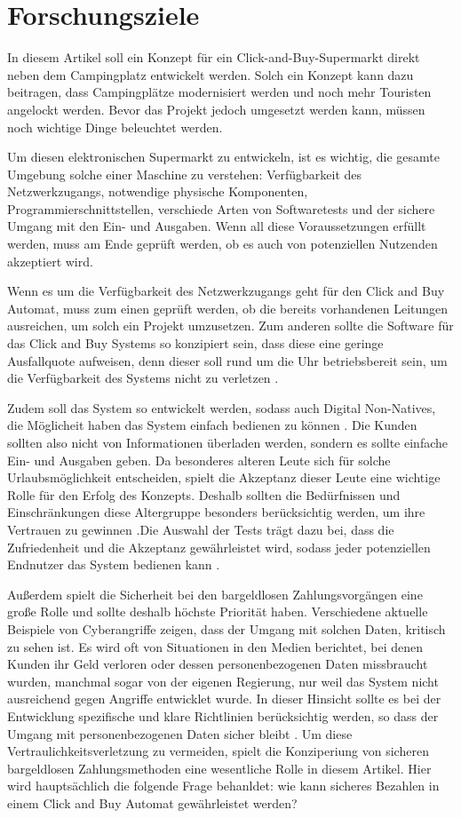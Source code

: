 \section{Forschungsziele}


In diesem Artikel soll ein Konzept für ein Click-and-Buy-Supermarkt direkt neben dem Campingplatz 
entwickelt werden. Solch ein Konzept kann dazu beitragen, dass Campingplätze modernisiert werden 
und noch mehr Touristen angelockt werden. Bevor das Projekt jedoch umgesetzt werden kann, müssen 
noch wichtige Dinge beleuchtet werden. 

Um diesen elektronischen Supermarkt zu entwickeln, ist es wichtig, die gesamte Umgebung solche einer Maschine
zu verstehen: Verfügbarkeit des Netzwerkzugangs, notwendige physische Komponenten, Programmierschnittstellen,
verschiede Arten von Softwaretests und der sichere Umgang mit den Ein- und Ausgaben. Wenn all diese 
Voraussetzungen erfüllt werden, muss am Ende geprüft werden, ob es auch von potenziellen Nutzenden 
akzeptiert wird. 

Wenn es um die Verfügbarkeit des Netzwerkzugangs geht für den Click and Buy Automat, muss zum einen 
geprüft werden, ob die bereits vorhandenen Leitungen ausreichen, um solch ein Projekt umzusetzen. Zum anderen 
sollte die Software für das Click and Buy Systems so konzipiert sein, dass diese eine geringe Ausfallquote
aufweisen, denn dieser soll rund um die Uhr betriebsbereit sein, um die Verfügbarkeit des Systems nicht zu
verletzen \cite{refbook:SWIS}.

Zudem soll das System so entwickelt werden, sodass auch  Digital Non-Natives, die Möglicheit 
haben das System einfach bedienen zu können \cite{refart:QWDN}. Die Kunden sollten also nicht von 
Informationen überladen werden, sondern es sollte einfache Ein- und Ausgaben geben. Da besonderes alteren
Leute sich für solche Urlaubsmöglichkeit entscheiden, spielt die Akzeptanz dieser Leute eine wichtige
Rolle für den Erfolg des Konzepts. Deshalb sollten die Bedürfnissen und Einschränkungen diese Altergruppe
besonders berücksichtig werden, um ihre Vertrauen zu gewinnen \cite{refart:HLAU}.Die Auswahl 
der Tests trägt dazu bei, dass die Zufriedenheit und die Akzeptanz gewährleistet wird, sodass jeder
potenziellen Endnutzer das System bedienen kann \cite{refbook:IASE}.

Außerdem spielt die Sicherheit bei den bargeldlosen Zahlungsvorgängen eine große Rolle und sollte deshalb 
höchste Priorität haben. Verschiedene aktuelle Beispiele von Cyberangriffe zeigen, dass der Umgang mit solchen 
Daten, kritisch zu sehen ist. Es wird oft von Situationen in den Medien berichtet, bei denen Kunden ihr
Geld verloren oder dessen personenbezogenen Daten missbraucht wurden, manchmal sogar von der eigenen Regierung,
nur weil das System nicht ausreichend gegen Angriffe entwicklet wurde. In dieser Hinsicht sollte es bei der 
Entwicklung spezifische und klare Richtlinien berücksichtig werden, so dass der Umgang mit personenbezogenen
Daten sicher bleibt \cite{refart:TRVR}. Um diese Vertraulichkeitsverletzung zu vermeiden, spielt die Konziperiung 
von sicheren bargeldlosen Zahlungsmethoden eine wesentliche Rolle in diesem Artikel. Hier wird hauptsächlich
die folgende Frage behanldet: wie kann sicheres Bezahlen in einem Click and Buy Automat gewährleistet werden?
